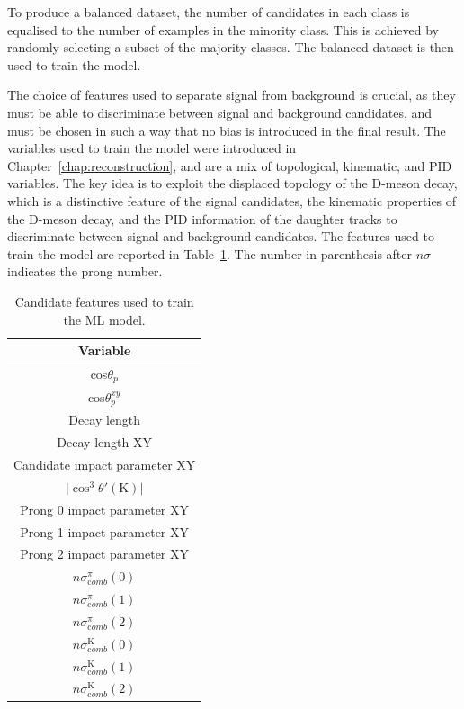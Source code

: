 \begin{sloppypar}
To produce a balanced dataset, the number of candidates in each class is equalised to the number of examples in the minority class. This is achieved by randomly selecting a subset of the majority classes. The balanced dataset is then used to train the model.
\end{sloppypar}

The choice of features used to separate signal from background is crucial, as they must be able to discriminate between signal and background candidates, and must be chosen in such a way that no bias is introduced in the final result. The variables used to train the model were introduced in Chapter~\ref{chap:reconstruction}, and are a mix of topological, kinematic, and PID variables. The key idea is to exploit the displaced topology of the D-meson decay, which is a distinctive feature of the signal candidates, the kinematic properties of the D-meson decay, and the PID information of the daughter tracks to discriminate between signal and background candidates. The features used to train the model are reported in Table~\ref{tab:ml_training_vars}. The number in parenthesis after $n\sigma$ indicates the prong number.

\begin{table}[htb]
    \begin{center}
    \caption{Candidate features used to train the ML model.}
    \label{tab:ml_training_vars}
    \vspace*{0.3cm}
    \begin{tabular}{c}
         \toprule
         Variable\\
         \midrule         
         cos$\theta_{p}$\\
         cos$\theta_{p}^{xy}$\\
         Decay length\\
         Decay length XY\\
         Candidate impact parameter XY\\
         $\lvert \cos^{3}\theta'(\mathrm K)\rvert$\\
         Prong 0 impact parameter XY\\
         Prong 1 impact parameter XY\\
         Prong 2 impact parameter XY\\
         $n\sigma_{\mathrm comb}^{\pi}(0)$\\         
         $n\sigma_{\mathrm comb}^{\pi}(1)$\\
         $n\sigma_{\mathrm comb}^{\pi}(2)$\\
         $n\sigma_{\mathrm comb}^{\mathrm K}(0)$\\
         $n\sigma_{\mathrm comb}^{\mathrm K}(1)$\\
         $n\sigma_{\mathrm comb}^{\mathrm K}(2)$\\
         \bottomrule
    \end{tabular}
    \end{center}
\end{table}

